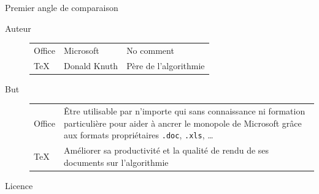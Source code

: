 \documentclass[10pt,svgnames,usenames,table]{beamer} %
\begin{document}
\begin{frame}{Premier angle de comparaison}
  \begin{description}
    \item[Auteur]
      \begin{tabular}{|lll|}
        \hline
        Office & Microsoft & No comment\\
        \TeX & Donald Knuth & Père de l'algorithmie\\
        \hline
      \end{tabular}
    \item[But]
      \begin{tabular}{|lp{}|}
        \hline
        Office & Être utilisable par n'importe qui sans connaissance ni
        formation particulière pour aider à ancrer le monopole de Microsoft
        grâce aux formats propriétaires \texttt{.doc}, \texttt{.xls}, \dots\\
        \TeX & Améliorer sa productivité et
        la qualité de rendu de ses documents sur l'algorithmie\\
        \hline
      \end{tabular}
    \item[Licence]
      \begin{tabular}{|lp{}|}

\end{tabular}
\end{description}
\end{frame}
\end{document}
